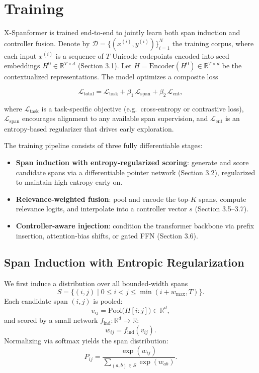 \section{Training}

X-Spanformer is trained end-to-end to jointly learn both span induction and controller fusion.  Denote by 
\(\mathcal{D}=\{(x^{(i)},y^{(i)})\}_{i=1}^N\) 
the training corpus, where each input \(x^{(i)}\) is a sequence of \(T\) Unicode codepoints encoded into seed embeddings \(H^0\in\mathbb{R}^{T\times d}\) (Section 3.1).  Let \(H=\mathrm{Encoder}(H^0)\in\mathbb{R}^{T\times d}\) be the contextualized representations.  The model optimizes a composite loss

\[
\mathcal{L}_{\mathrm{total}}
= \mathcal{L}_{\mathrm{task}}
+ \beta_1\,\mathcal{L}_{\mathrm{span}}
+ \beta_2\,\mathcal{L}_{\mathrm{ent}},
\]

where
\(\mathcal{L}_{\mathrm{task}}\) is a task‐specific objective (e.g.\ cross‐entropy or contrastive loss),
\(\mathcal{L}_{\mathrm{span}}\) encourages alignment to any available span supervision, and
\(\mathcal{L}_{\mathrm{ent}}\) is an entropy‐based regularizer that drives early exploration.

The training pipeline consists of three fully differentiable stages:
\begin{itemize}
	\item \textbf{Span induction with entropy‐regularized scoring}: generate and score candidate spans via a differentiable pointer network (Section 3.2), regularized to maintain high entropy early on.
	\item \textbf{Relevance‐weighted fusion}: pool and encode the top-\(K\) spans, compute relevance logits, and interpolate into a controller vector \(s\) (Section 3.5–3.7).
	\item \textbf{Controller‐aware injection}: condition the transformer backbone via prefix insertion, attention‐bias shifts, or gated FFN (Section 3.6).
\end{itemize}

\subsection{Span Induction with Entropic Regularization}

We first induce a distribution over all bounded‐width spans
\[
S = \{(i,j)\mid 0\le i<j\le\min(i+w_{\max},T)\}.
\]
Each candidate span \((i,j)\) is pooled:
\[
v_{ij} = \mathrm{Pool}\bigl(H[i:j]\bigr)\in\mathbb{R}^d,
\]
and scored by a small network \(f_{\mathrm{ind}}:\mathbb{R}^d\to\mathbb{R}\):
\[
w_{ij} = f_{\mathrm{ind}}(v_{ij}).
\]
Normalizing via softmax yields the span distribution:
\[
P_{ij} = \frac{\exp(w_{ij})}
{\sum_{(a,b)\in S}\exp(w_{ab})}.
\]

